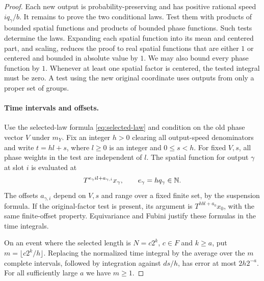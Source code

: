 \begin{proof}
Each new output is probability-preserving and has positive rational
speed $iq_\gamma/b$.  It remains to prove the two conditional laws.
Test them with products of bounded spatial functions and products of
bounded phase functions.  Such tests determine the laws.  Expanding
each spatial function into its mean and centered part, and scaling,
reduces the proof to real spatial functions that are either $1$ or
centered and bounded in absolute value by $1$.  We may also bound every
phase function by $1$.  Whenever at least one spatial factor is
centered, the tested integral must be zero.  A test using the new
original coordinate uses outputs from only a proper set of groups.

\paragraph{Time intervals and offsets.}
Use the selected-law formula \eqref{eq:selected-law} and condition on
the old phase vector $V$ under $m_Y$.  Fix an integer $h>0$ clearing
all output-speed denominators and write
$t=hl+s$, where $l\ge0$ is an integer and $0\le s<h$.
For fixed $V,s$, all phase weights in the test are independent of $l$.
The spatial function for output $\gamma$ at slot $i$ is evaluated at
\begin{equation}\label{eq:channel-times}
 T^{e_\gamma i l+a_{\gamma,i}}x_\gamma,
 \qquad e_\gamma=hq_\gamma\in\mathbb N.
\end{equation}
The offsets $a_{\gamma,i}$ depend on $V,s$ and range over a fixed
finite set, by the suspension formula.  If the original-factor test
is present, its argument is $T^{hbl+a_0}x_0$, with the same finite-offset
property.  Equivariance and Fubini justify these formulas in the time
integrals.

On an event where the selected length is $N=c2^k$, $c\in F$ and
$k\ge a$, put $m=\lfloor c2^k/h\rfloor$.  Replacing the normalized
time integral by the average over the $m$ complete intervals, followed
by integration against $ds/h$, has error at most $2h2^{-a}$.
For all sufficiently large $a$ we have $m\ge1$.


\end{proof}
